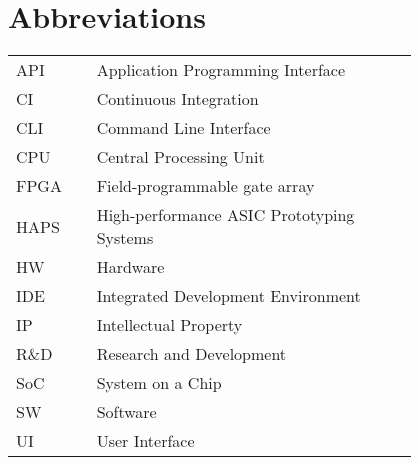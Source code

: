 \chapter*{Abbreviations}

\begin{flushleft}
\begin{tabular}{l p{0.8\linewidth}}

API		& Application Programming Interface\\
CI		& Continuous Integration\\
CLI		& Command Line Interface\\
CPU		& Central Processing Unit\\
FPGA	& Field-programmable gate array\\
HAPS	& High-performance ASIC Prototyping Systems\\
HW		& Hardware\\
IDE		& Integrated Development Environment\\
IP		& Intellectual Property\\
R\&D	& Research and Development\\
SoC		& System on a Chip\\
SW		& Software\\
UI 		& User Interface
\end{tabular}
\end{flushleft}


